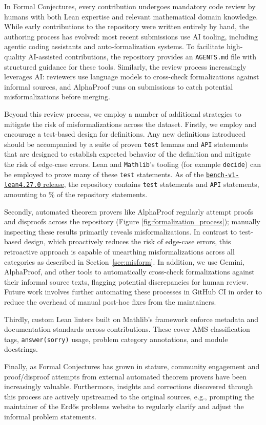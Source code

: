 In Formal Conjectures, every contribution undergoes mandatory code review by humans with both Lean expertise and relevant mathematical domain knowledge.
While early contributions to the repository were written entirely by hand, the authoring process has evolved: most recent submissions use AI tooling, including agentic coding assistants and auto-formalization systems.
To facilitate high-quality AI-assisted contributions, the repository provides an \texttt{AGENTS.md} file with structured guidance for these tools.
Similarly, the review process increasingly leverages AI: reviewers use language models to cross-check formalizations against informal sources, and AlphaProof runs on submissions to catch potential misformalizations before merging.

Beyond this review process, we employ a number of additional strategies to mitigate the risk of misformalizations across the dataset.
Firstly, we employ and encourage a test-based design for definitions.
Any new definitions introduced should be accompanied by a suite of proven \texttt{test} lemmas and \texttt{API} statements that are designed to establish
expected behavior of the definition and mitigate the risk of edge-case errors.
Lean and \lstinline{Mathlib}'s tooling (for example \lstinline{decide}) can be employed to prove many of these \texttt{test} statements.
As of the \href{https://github.com/google-deepmind/formal-conjectures/releases/tag/bench-v1-lean4.27.0}{\texttt{bench-v1-lean4.27.0} release}, the repository contains \fcCountTest{} \texttt{test} statements and \fcCountAPI{} \texttt{API} statements, amounting to \fcCountInfraPct\% of the repository statements.

Secondly, automated theorem provers like AlphaProof regularly attempt proofs and disproofs across the repository (Figure \ref{fig:formalization_process}); manually inspecting these results primarily reveals misformalizations.
In contrast to test-based design, which proactively reduces the risk of edge-case errors, this retroactive approach is capable of unearthing misformalizations across all categories as described in Section~\ref{sec:misform}.
In addition, we use Gemini, AlphaProof, and other tools to automatically cross-check formalizations against their informal source texts, flagging potential discrepancies for human review.
Future work involves further automating these processes in GitHub CI in order to reduce the overhead of manual post-hoc fixes from the maintainers.

Thirdly, custom Lean linters built on Mathlib's framework enforce metadata and documentation standards across contributions.
These cover AMS classification tags, \lstinline{answer(sorry)} usage, problem category annotations, and module docstrings.

Finally, as Formal Conjectures has grown in stature, community engagement and proof/disproof attempts from external automated theorem provers have been increasingly valuable.
Furthermore, insights and corrections discovered through this process are actively upstreamed to the original sources, e.g., prompting the maintainer of the Erdős problems website to regularly clarify and adjust the informal problem statements.
